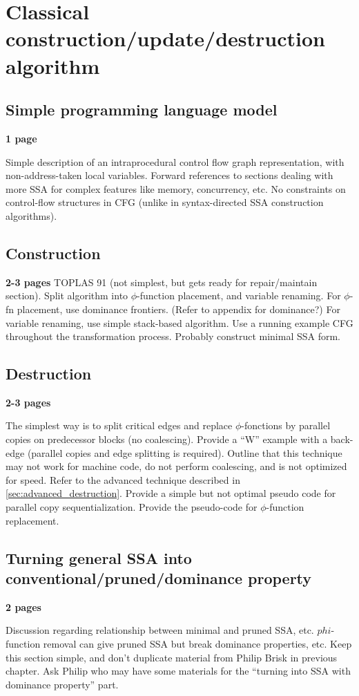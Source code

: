 \chapter{Classical construction/update/destruction algorithm }

\section{Simple programming language model}
\textbf{1 page}

Simple description of an intraprocedural control flow graph
representation, with non-address-taken local variables.
Forward references to sections dealing with more SSA for complex
features like memory, concurrency, etc.
No constraints on control-flow structures in CFG
(unlike in syntax-directed SSA construction algorithms).


\section{Construction}
\textbf{2-3 pages}
TOPLAS 91 (not simplest, but gets ready for repair/maintain section).
Split algorithm into $\phi$-function placement, and variable
renaming. For $\phi$-fn placement, use dominance frontiers.
(Refer to appendix for dominance?) 
For variable renaming, use simple stack-based algorithm.
Use a running example CFG throughout the transformation process.
Probably construct minimal SSA form.

\section{Destruction }
\label{sec:classical_destruction}
\textbf{2-3 pages}

The simplest way is to split critical edges and replace $\phi$-fonctions by parallel copies on predecessor blocks (no coalescing). Provide a ``W'' example with a back-edge (parallel copies and edge splitting is required). Outline that this technique may not work for machine code, do not perform coalescing, and is not optimized for speed. Refer to the advanced technique described in \ref{sec:advanced_destruction}. Provide a simple but not optimal pseudo code for parallel copy sequentialization. Provide the pseudo-code for $\phi$-function replacement.

\section{Turning general SSA into conventional/pruned/dominance property}
\textbf{2 pages}

Discussion regarding relationship between minimal and pruned SSA, etc.
$phi$-function removal can give pruned SSA but break
dominance properties, etc. Keep this section simple, and don't duplicate
material from Philip Brisk in previous chapter.
Ask Philip who may have some materials for the ``turning into SSA with dominance property'' part.

